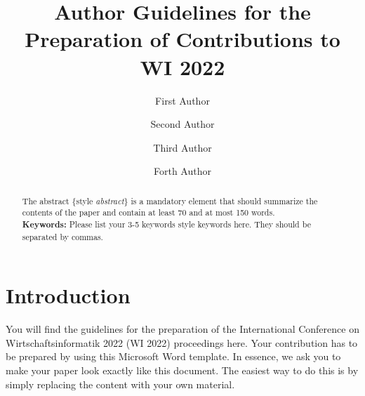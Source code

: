 \documentclass{llncs}
\begin{document}
\frontmatter          %

\mainmatter              %


\title{Author Guidelines for the Preparation of Contributions to WI 2022}


\author{First Author \and
Second Author \and
Third Author \and
Forth Author}


\maketitle
\setcounter{footnote}{0}

\begin{abstract}
The abstract $\{$style \textit{abstract}$\}$ is a mandatory element that should summarize the contents of the paper and contain at least 70 and at most 150 words.\\

{\bfseries Keywords:} Please list your 3-5 keywords {style keywords} here. They should be separated by commas.
\end{abstract}

\thispagestyle{WI_footer}


\section{Introduction}
\label{sec:introduction}

You will find the guidelines for the preparation of the International Conference on Wirtschaftsinformatik 2022 (WI 2022) proceedings here. 
Your contribution has to be prepared by using this Microsoft Word template. 
In essence, we ask you to make your paper look exactly like this document. 
The easiest way to do this is by simply replacing the content with your own material.
\end{document}
